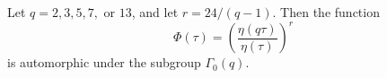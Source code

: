 Let $q = 2, 3, 5, 7,$ or $13$, and let $r = 24/(q - 1)$. Then the function
$$\Phi(\tau) = \left( \frac{\eta(q\tau)}{\eta(\tau)} \right)^r$$
is automorphic under the subgroup $\Gamma_0(q)$.
